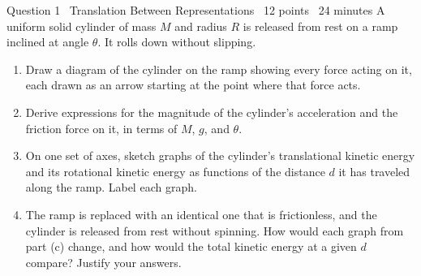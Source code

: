 \documentclass[11pt]{article}
\begin{document}
\begin{frq}{Question 1 \textperiodcentered\ Translation Between Representations \textperiodcentered\ 12 points \textperiodcentered\ 24 minutes}
A uniform solid cylinder of mass $M$ and radius $R$ is released from rest on a ramp inclined at angle $\theta$. It rolls down without slipping.

\begin{enumerate}[label=(\alph*),leftmargin=2em,itemsep=4pt]
\item Draw a diagram of the cylinder on the ramp showing every force acting on it, each drawn as an arrow starting at the point where that force acts. 
\item Derive expressions for the magnitude of the cylinder's acceleration and the friction force on it, in terms of $M$, $g$, and $\theta$. 
\item On one set of axes, sketch graphs of the cylinder's translational kinetic energy and its rotational kinetic energy as functions of the distance $d$ it has traveled along the ramp. Label each graph. 
\item The ramp is replaced with an identical one that is frictionless, and the cylinder is released from rest without spinning. How would each graph from part (c) change, and how would the total kinetic energy at a given $d$ compare? Justify your answers. 
\end{enumerate}
\end{frq}

\makekey
\end{document}
